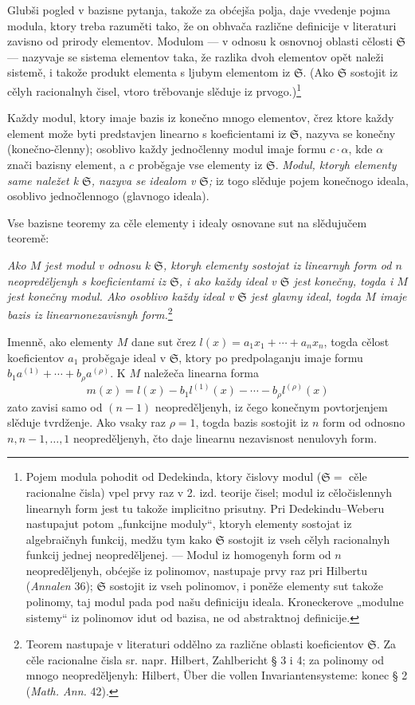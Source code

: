 \documentclass[11pt]{article}
\providecommand{\frS}{\mathfrak S}
\begin{document}
Glubši pogled v bazisne pytanja, takože za obćejša polja, daje vvedenje pojma modula, ktory treba razuměti tako, že on obhvača različne definicije v literaturi zavisno od prirody elementov. Modulom --- v odnosu k osnovnoj oblasti cělosti \(\frS\) --- nazyvaje se sistema elementov taka, že razlika dvoh elementov opět naleži sistemě, i takože produkt elementa s ljubym elementom iz \(\frS\). (Ako \(\frS\) sostojit iz cělyh racionalnyh čisel, vtoro trěbovanje slěduje iz prvogo.)\footnote{Pojem modula pohodit od Dedekinda, ktory čislovy modul (\(\frS=\) cěle racionalne čisla) vpel prvy raz v 2. izd. teorije čisel; modul iz cěločislennyh linearnyh form jest tu takože implicitno prisutny. Pri Dedekindu--Weberu nastupajut potom „funkcijne moduly“, ktoryh elementy sostojat iz algebraičnyh funkcij, medžu tym kako \(\frS\) sostojit iz vseh cělyh racionalnyh funkcij jednej neopreděljenej. --- Modul iz homogenyh form od \(n\) neopreděljenyh, obćejše iz polinomov, nastupaje prvy raz pri Hilbertu (\emph{Annalen} 36); \(\frS\) sostojit iz vseh polinomov, i poněže elementy sut takože polinomy, taj modul pada pod našu definiciju ideala. Kroneckerove „modulne sistemy“ iz polinomov idut od bazisa, ne od abstraktnoj definicije.}

Každy modul, ktory imaje bazis iz konečno mnogo elementov, črez ktore každy element može byti predstavjen linearno s koeficientami iz \(\frS\), nazyva se konečny (konečno-členny); osoblivo každy jednočlenny modul imaje formu \(c\cdot\alpha\), kde \(\alpha\) znači bazisny element, a \(c\) proběgaje vse elementy iz \(\frS\). {\itshape Modul, ktoryh elementy same naležet k \(\frS\), nazyva se idealom v \(\frS\);} iz togo slěduje pojem konečnogo ideala, osoblivo jednočlennogo (glavnogo ideala).

Vse bazisne teoremy za cěle elementy i idealy osnovane sut na slědujučem teoremě:

{\itshape Ako \(M\) jest modul v odnosu k \(\frS\), ktoryh elementy sostojat iz linearnyh form od \(n\) neopreděljenyh s koeficientami iz \(\frS\), i ako každy ideal v \(\frS\) jest konečny, togda i \(M\) jest konečny modul. Ako osoblivo každy ideal v \(\frS\) jest glavny ideal, togda \(M\) imaje bazis iz linearnonezavisnyh form.}\footnote{Teorem nastupaje v literaturi oddělno za različne oblasti koeficientov \(\frS\). Za cěle racionalne čisla sr. napr. Hilbert, Zahlbericht § 3 i 4; za polinomy od mnogo neopreděljenyh: Hilbert, Über die vollen Invariantensysteme: konec § 2 (\emph{Math. Ann.} 42).}

Imenně, ako elementy \(M\) dane sut črez \(l(x)=a_1x_1+\cdots+a_nx_n\), togda cělost koeficientov \(a_1\) proběgaje ideal v \(\frS\), ktory po predpolaganju imaje formu \(b_1a^{(1)}+\cdots+b_\rho a^{(\rho)}\). K \(M\) naležeča linearna forma
\[
m(x)=l(x)-b_1l^{(1)}(x)-\cdots-b_\rho l^{(\rho)}(x)
\]
zato zavisi samo od \((n-1)\) neopreděljenyh, iz čego konečnym povtorjenjem slěduje tvrdženje. Ako vsaky raz \(\rho=1\), togda bazis sostojit iz \(n\) form od odnosno \(n,n-1,\ldots,1\) neopreděljenyh, čto daje linearnu nezavisnost nenulovyh form.
\end{document}
